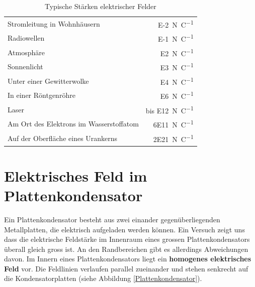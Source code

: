 \documentclass[11pt,twoside=false,open=any]{scrbook}
\begin{document}
\begin{table}[h]
\begin{center}
\begin{tabular}{|l|r|}
\hline
Stromleitung in Wohnhäusern 				& \SI{E-2}{\newton \per \coulomb} \\
Radiowellen  								& \SI{E-1}{\newton \per \coulomb} \\
Atmosphäre  								& \SI{E2}{\newton \per \coulomb} \\
Sonnenlicht  								& \SI{E3}{\newton \per \coulomb} \\
Unter einer Gewitterwolke  					& \SI{E4}{\newton \per \coulomb} \\
In einer Röntgenröhre  						& \SI{E6}{\newton \per \coulomb} \\
Laser 										& bis \SI{E12}{\newton \per \coulomb} \\
Am Ort des Elektrons im Wasserstoffatom  	& \SI{6E11}{\newton \per \coulomb} \\
Auf der Oberfläche eines Urankerns  		& \SI{2E21}{\newton \per \coulomb} \\
\hline
\end{tabular}
\caption{Typische Stärken elektrischer Felder}
\end{center}
\end{table}


\begin{center}
   \setlength{\fboxrule}{2pt}
\end{center}

\section{Elektrisches Feld im Plattenkondensator}
Ein Plattenkondensator besteht aus zwei einander gegenüberliegenden Metallplatten, die elektrisch aufgeladen werden können. Ein Versuch zeigt uns dass die elektrische Feldstärke im Innenraum eines grossen Plattenkondensators überall gleich gross ist. An den Randbereichen gibt es allerdings Abweichungen davon. Im Innern eines Plattenkondensators liegt ein \textbf{homogenes elektrisches Feld} vor. Die Feldlinien verlaufen parallel zueinander und stehen senkrecht auf die Kondensatorplatten (siehe Abbildung \ref{Plattenkondensator}).
\end{document}
